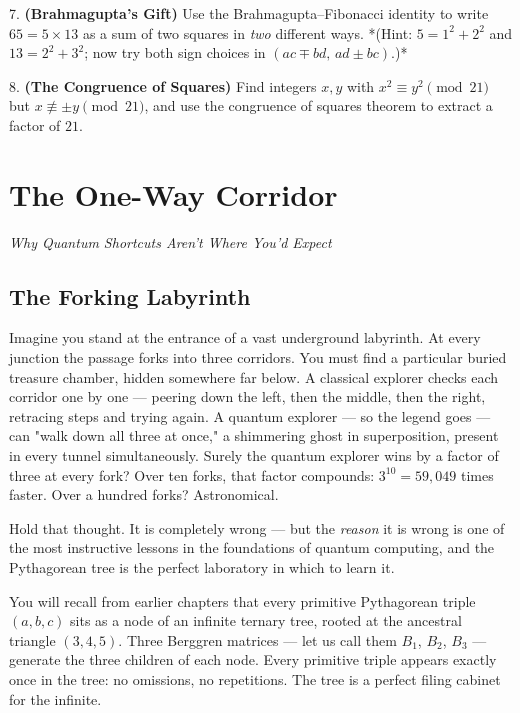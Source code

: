 \documentclass[11pt,openright,twoside]{book}
\theoremstyle{definition}
\begin{document}
7. \textbf{(Brahmagupta's Gift)} Use the Brahmagupta--Fibonacci identity to write $65 = 5 \times 13$ as a sum of two squares in \textit{two} different ways. *(Hint: $5 = 1^2 + 2^2$ and $13 = 2^2 + 3^2$; now try both sign choices in $(ac \mp bd, \, ad \pm bc)$.)*

8. \textbf{(The Congruence of Squares)} Find integers $x, y$ with $x^2 \equiv y^2 \pmod{21}$ but $x \not\equiv \pm y \pmod{21}$, and use the congruence of squares theorem to extract a factor of $21$.

\clearpage


\chapter{The One-Way Corridor}
\label{ch:7}

\begin{center}
\textit{Why Quantum Shortcuts Aren't Where You'd Expect}
\end{center}
\bigskip




\bigskip


\section{The Forking Labyrinth}

Imagine you stand at the entrance of a vast underground labyrinth. At every junction the passage forks into three corridors. You must find a particular buried treasure chamber, hidden somewhere far below. A classical explorer checks each corridor one by one --- peering down the left, then the middle, then the right, retracing steps and trying again. A quantum explorer --- so the legend goes --- can "walk down all three at once," a shimmering ghost in superposition, present in every tunnel simultaneously. Surely the quantum explorer wins by a factor of three at every fork? Over ten forks, that factor compounds: $3^{10} = 59{,}049$ times faster. Over a hundred forks? Astronomical.

Hold that thought. It is completely wrong --- but the \textit{reason} it is wrong is one of the most instructive lessons in the foundations of quantum computing, and the Pythagorean tree is the perfect laboratory in which to learn it.

You will recall from earlier chapters that every primitive Pythagorean triple $(a, b, c)$ sits as a node of an infinite ternary tree, rooted at the ancestral triangle $(3, 4, 5)$. Three Berggren matrices --- let us call them $B_1$, $B_2$, $B_3$ --- generate the three children of each node. Every primitive triple appears exactly once in the tree: no omissions, no repetitions. The tree is a perfect filing cabinet for the infinite.
\end{document}
